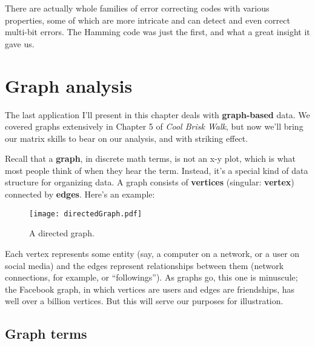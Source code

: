 \begin{alttitles}
There are actually whole families of error correcting codes with various
properties, some of which are more intricate and can detect and even correct
multi-bit errors. The Hamming code was just the first, and what a great insight
it gave us.



\pagebreak

\renewcommand{\thesubsection}{G\arabic{subsection}.}%
\section{Graph analysis}

\label{sec:graphs}

The last application I'll present in this chapter deals with
\textbf{graph-based} data. We covered graphs extensively in Chapter 5 of
\textit{Cool Brisk Walk}, but now we'll bring our matrix skills to bear on our
analysis, and with striking effect.


Recall that a \textbf{graph}, in discrete math terms, is not an x-y plot,
which is what most people think of when they hear the term. Instead, it's a
special kind of data structure for organizing data. A graph consists of
\textbf{vertices} (singular: \textbf{vertex}) connected by \textbf{edges}.
Here's an example:

\begin{figure}[ht]
\centering
\texttt{[image: directedGraph.pdf]}
\caption{A directed graph.}
\label{fig:directedGraph}
\end{figure}

Each vertex represents some entity (say, a computer on a network, or a user on
social media) and the edges represent relationships between them (network
connections, for example, or ``followings''). As graphs go, this one is
minuscule; the Facebook graph, in which vertices are users and edges are
friendships, has well over a billion vertices. But this will serve our purposes
for illustration.


\subsection{Graph terms}


\end{alttitles}
